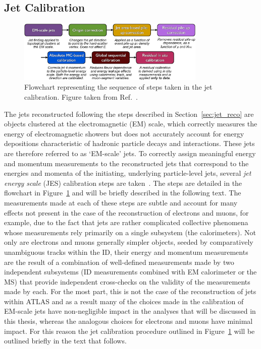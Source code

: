 \subsection{Jet Calibration}
\label{sec:jet_calib}

\begin{figure}[!htb]
    \begin{center}
        \includegraphics[width=0.8\textwidth]{figures/chapter3/jets/jes_calibration_sequence}
        \caption{
            Flowchart representing the sequence of steps taken in the jet calibration.
            Figure taken from Ref.~\cite{Aaboud:2017jcu}.
        }
        \label{fig:jes_sequence}
    \end{center}
\end{figure}

The jets reconstructed following the steps described in Section~\ref{sec:jet_reco} are objects clustered
at the electromagnetic (EM) scale, which correctly measures the energy of electromagnetic showers but does not
accurately account for energy depositions characteristic of hadronic particle decays and interactions.
These jets are therefore referred to as `EM-scale' jets.
To correctly assign meaningful energy and momentum measurements to the reconstructed jets that correspond
to the energies and momenta of the initiating, underlying particle-level jets, several \textit{jet energy scale} (JES) calibration steps are taken~\cite{Aaboud:2017jcu}.
The steps are detailed in the flowchart in Figure~\ref{fig:jes_sequence} and will be briefly described in the following text.
The measurements made at each of these steps are subtle and account for many effects not present in the case
of the reconstruction of electrons and muons, for example, due to the fact that jets are rather complicated collective phenomena
whose measurements rely primarily on a single subsystem (the calorimeters).
Not only are electrons and muons generally simpler objects, seeded by comparatively unambiguous tracks within the ID,
their energy and momentum measurements are the result of a combination of well-defined measurements made by two independent
subsystems (ID measurements combined with EM calorimeter or the MS) that provide independent cross-checks on the validity
of the measurements made by each.
For the most part, this is not the case of the reconstruction of jets within ATLAS and as a result many of the choices made in the calibration
of EM-scale jets have non-negligible impact in the analyses that will be discussed in this thesis, whereas the analogous
choices for electrons and muons have minimal impact.
For this reason the jet calibration procedure outlined in Figure~\ref{fig:jes_sequence} will be outlined briefly in the text that follows.

